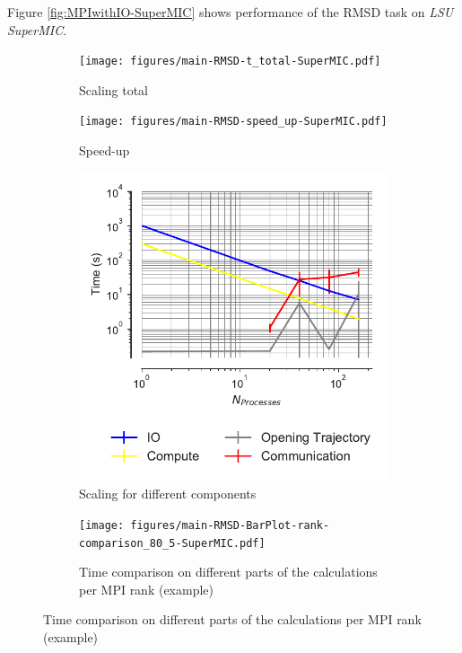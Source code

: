 Figure \ref{fig:MPIwithIO-SuperMIC} shows performance of the RMSD task on \emph{LSU SuperMIC}. 

\begin{figure}[!htb]
  \centering
  \begin{subfigure}{.4\textwidth}
    \texttt{[image: figures/main-RMSD-t\_total-SuperMIC.pdf]}
    \caption{Scaling total}
    \label{fig:MPIscaling-SuperMIC}
  \end{subfigure}
  \hfill
  \begin{subfigure}{.4\textwidth}
    \texttt{[image: figures/main-RMSD-speed\_up-SuperMIC.pdf]}
    \caption{Speed-up}
    \label{fig:MPIspeedup-SuperMIC}
  \end{subfigure}
  \bigskip

  \begin{subfigure}{.45\textwidth}
    \includegraphics[width=\linewidth]{figures/main-RMSD-time_comp_IO_comparison-SuperMIC.pdf}
    \captionsetup{format=hang}
    \caption{Scaling for different components}
    \label{fig:ScalingComputeIO-SuperMIC}
  \end{subfigure}
  \hfill
  \begin{subfigure} {.5\textwidth}
    \texttt{[image: figures/main-RMSD-BarPlot-rank-comparison\_80\_5-SuperMIC.pdf]}
    \captionsetup{format=hang}
    \caption{Time comparison on different parts of the calculations per MPI rank (example)}

\end{subfigure}
\end{figure}
